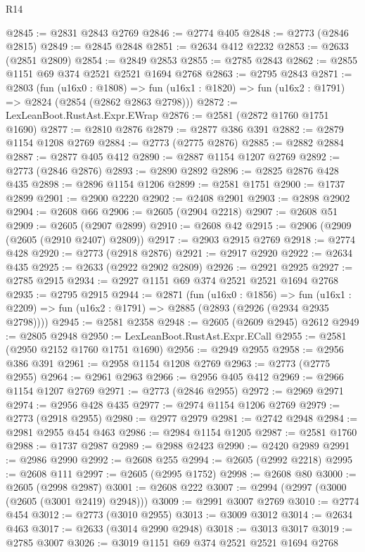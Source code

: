 \begin{lexlean}{R14}
\begin{coremodule}
@2845 := @2831 @2843 @2769
@2846 := @2774 @405
@2848 := @2773 (@2846 @2815)
@2849 := @2845 @2848
@2851 := @2634 @412 @2232
@2853 := @2633 (@2851 @2809)
@2854 := @2849 @2853
@2855 := @2785 @2843
@2862 := @2855 @1151 @69 @374 @2521 @2521 @1694 @2768
@2863 := @2795 @2843
@2871 := @2803
    (fun (u16x0 : @1808) =>
    fun (u16x1 : @1820) => fun (u16x2 : @1791) => @2824 (@2854 (@2862 @2863 @2798)))
@2872 := LexLeanBoot.RustAst.Expr.EWrap
@2876 := @2581 (@2872 @1760 @1751 @1690)
@2877 := @2810 @2876
@2879 := @2877 @386 @391
@2882 := @2879 @1154 @1208 @2769
@2884 := @2773 (@2775 @2876)
@2885 := @2882 @2884
@2887 := @2877 @405 @412
@2890 := @2887 @1154 @1207 @2769
@2892 := @2773 (@2846 @2876)
@2893 := @2890 @2892
@2896 := @2825 @2876 @428 @435
@2898 := @2896 @1154 @1206
@2899 := @2581 @1751
@2900 := @1737 @2899
@2901 := @2900 @2220
@2902 := @2408 @2901
@2903 := @2898 @2902
@2904 := @2608 @66
@2906 := @2605 (@2904 @2218)
@2907 := @2608 @51
@2909 := @2605 (@2907 @2899)
@2910 := @2608 @42
@2915 := @2906 (@2909 (@2605 (@2910 @2407) @2809))
@2917 := @2903 @2915 @2769
@2918 := @2774 @428
@2920 := @2773 (@2918 @2876)
@2921 := @2917 @2920
@2922 := @2634 @435
@2925 := @2633 (@2922 @2902 @2809)
@2926 := @2921 @2925
@2927 := @2785 @2915
@2934 := @2927 @1151 @69 @374 @2521 @2521 @1694 @2768
@2935 := @2795 @2915
@2944 := @2871
    (fun (u16x0 : @1856) =>
    fun (u16x1 : @2209) => fun (u16x2 : @1791) => @2885 (@2893 (@2926 (@2934 @2935 @2798))))
@2945 := @2581 @2358
@2948 := @2605 (@2609 @2945) @2612
@2949 := @2805 @2948
@2950 := LexLeanBoot.RustAst.Expr.ECall
@2955 := @2581 (@2950 @2152 @1760 @1751 @1690)
@2956 := @2949 @2955
@2958 := @2956 @386 @391
@2961 := @2958 @1154 @1208 @2769
@2963 := @2773 (@2775 @2955)
@2964 := @2961 @2963
@2966 := @2956 @405 @412
@2969 := @2966 @1154 @1207 @2769
@2971 := @2773 (@2846 @2955)
@2972 := @2969 @2971
@2974 := @2956 @428 @435
@2977 := @2974 @1154 @1206 @2769
@2979 := @2773 (@2918 @2955)
@2980 := @2977 @2979
@2981 := @2742 @2948
@2984 := @2981 @2955 @454 @463
@2986 := @2984 @1154 @1205
@2987 := @2581 @1760
@2988 := @1737 @2987
@2989 := @2988 @2423
@2990 := @2420 @2989
@2991 := @2986 @2990
@2992 := @2608 @255
@2994 := @2605 (@2992 @2218)
@2995 := @2608 @111
@2997 := @2605 (@2995 @1752)
@2998 := @2608 @80
@3000 := @2605 (@2998 @2987)
@3001 := @2608 @222
@3007 := @2994 (@2997 (@3000 (@2605 (@3001 @2419) @2948)))
@3009 := @2991 @3007 @2769
@3010 := @2774 @454
@3012 := @2773 (@3010 @2955)
@3013 := @3009 @3012
@3014 := @2634 @463
@3017 := @2633 (@3014 @2990 @2948)
@3018 := @3013 @3017
@3019 := @2785 @3007
@3026 := @3019 @1151 @69 @374 @2521 @2521 @1694 @2768

\end{coremodule}
\end{lexlean}
